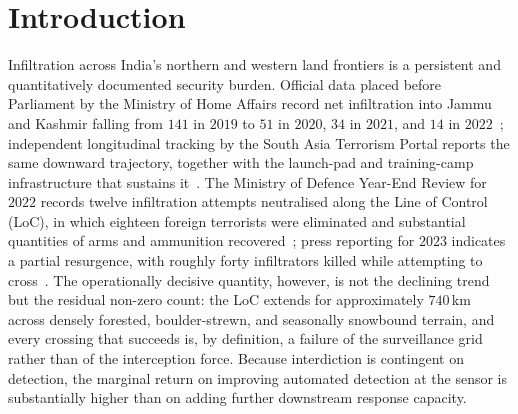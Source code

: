 \documentclass[3p,times,procedia]{elsarticle}
\begin{document}

\vspace*{-6pt}

\section{Introduction}
\label{sec:intro}

Infiltration across India's northern and western land frontiers is a persistent and quantitatively documented security burden. Official data placed before Parliament by the Ministry of Home Affairs record net infiltration into Jammu and Kashmir falling from $141$ in $2019$ to $51$ in $2020$, $34$ in $2021$, and $14$ in $2022$~\cite{mha2021}; independent longitudinal tracking by the South Asia Terrorism Portal reports the same downward trajectory, together with the launch-pad and training-camp infrastructure that sustains it~\cite{satp}. The Ministry of Defence Year-End Review for $2022$ records twelve infiltration attempts neutralised along the Line of Control (LoC), in which eighteen foreign terrorists were eliminated and substantial quantities of arms and ammunition recovered~\cite{mod2022}; press reporting for $2023$ indicates a partial resurgence, with roughly forty infiltrators killed while attempting to cross~\cite{dh2023}. The operationally decisive quantity, however, is not the declining trend but the residual non-zero count: the LoC extends for approximately $740$\,km across densely forested, boulder-strewn, and seasonally snowbound terrain, and every crossing that succeeds is, by definition, a failure of the surveillance grid rather than of the interception force. Because interdiction is contingent on detection, the marginal return on improving automated detection at the sensor is substantially higher than on adding further downstream response capacity.
\end{document}
